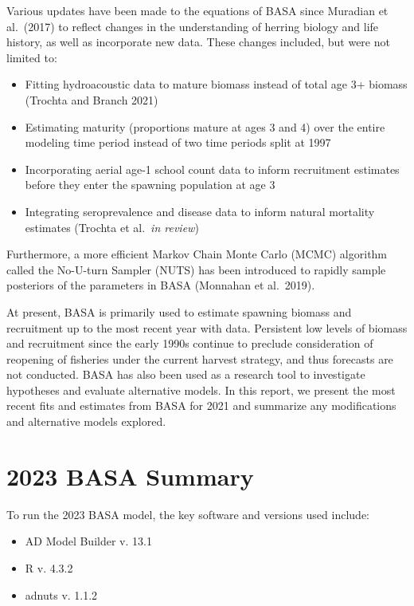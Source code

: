 \documentclass[
  11pt,
]{article}
\providecommand{\tightlist}{%
  \setlength{\itemsep}{0pt}\setlength{\parskip}{0pt}}
\begin{document}
Various updates have been made to the equations of BASA since Muradian
et al.~(2017) to reflect changes in the understanding of herring biology
and life history, as well as incorporate new data. These changes
included, but were not limited to:

\begin{itemize}
\tightlist
\item
  Fitting hydroacoustic data to mature biomass instead of total age 3+
  biomass (Trochta and Branch 2021)
\item
  Estimating maturity (proportions mature at ages 3 and 4) over the
  entire modeling time period instead of two time periods split at 1997
\item
  Incorporating aerial age-1 school count data to inform recruitment
  estimates before they enter the spawning population at age 3
\item
  Integrating seroprevalence and disease data to inform natural
  mortality estimates (Trochta et al.~\emph{in review})
\end{itemize}

Furthermore, a more efficient Markov Chain Monte Carlo (MCMC) algorithm
called the No-U-turn Sampler (NUTS) has been introduced to rapidly
sample posteriors of the parameters in BASA (Monnahan et al.~2019).

At present, BASA is primarily used to estimate spawning biomass and
recruitment up to the most recent year with data. Persistent low levels
of biomass and recruitment since the early 1990s continue to preclude
consideration of reopening of fisheries under the current harvest
strategy, and thus forecasts are not conducted. BASA has also been used
as a research tool to investigate hypotheses and evaluate alternative
models. In this report, we present the most recent fits and estimates
from BASA for 2021 and summarize any modifications and alternative
models explored.

\hypertarget{basa-summary}{%
\section{2023 BASA Summary}\label{basa-summary}}

To run the 2023 BASA model, the key software and versions used include:

\begin{itemize}
\tightlist
\item
  AD Model Builder v. 13.1
\item
  R v. 4.3.2
\item
  adnuts v. 1.1.2
\end{itemize}
\end{document}
